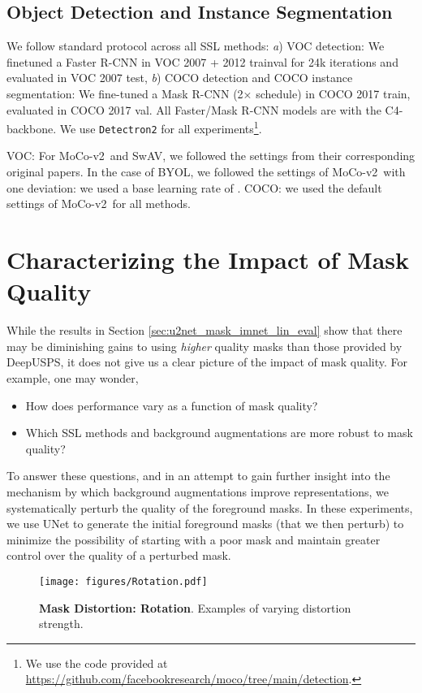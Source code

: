 \documentclass[twoside,11pt]{article}
\newcommand{\moco}{MoCo-v2}
\begin{document}
\subsection{Object Detection and Instance Segmentation}

We follow standard protocol across all SSL methods: \textit{a}) VOC detection: We finetuned a Faster R-CNN \citep{ren_faster_2015} in VOC 2007 + 2012 trainval for 24k iterations and evaluated in VOC 2007 test, \textit{b}) COCO detection and COCO instance segmentation: We fine-tuned a Mask R-CNN \citep{he_mask_2017} (2× schedule) in COCO 2017 train, evaluated in COCO 2017 val. All Faster/Mask R-CNN models are with the C4-backbone. We use \texttt{Detectron2} \citep{wu2019detectron2} for all experiments\footnote{We use the code provided at \url{https://github.com/facebookresearch/moco/tree/main/detection}.}.

VOC: For \moco~and SwAV, we followed the settings from their corresponding original papers. In the case of BYOL, we followed the settings of \moco~with one deviation: we used a base learning rate of . COCO: we used the default settings of \moco~for all methods.


\section{Characterizing the Impact of Mask Quality} 
\label{app:noisy_masks}
While the results in Section \ref{sec:u2net_mask_imnet_lin_eval} show that there may be diminishing gains to using \textit{higher} quality masks than those provided by DeepUSPS, it does not give us a clear picture of the impact of mask quality. For example, one may wonder,
\begin{itemize}
    \item How does performance vary as a function of mask quality?
    \item Which SSL methods and background augmentations are more robust to mask quality?
\end{itemize}

To answer these questions, and in an attempt to gain further insight into the mechanism by which background augmentations improve representations, we systematically perturb the quality of the foreground masks. In these experiments, we use UNet to generate the initial foreground masks (that we then perturb) to minimize the possibility of starting with a poor mask and maintain greater control over the quality of a perturbed mask. 

\begin{figure}
    \centering
    \texttt{[image: figures/Rotation.pdf]}
    \caption{{\bf Mask Distortion: Rotation}. Examples of varying distortion strength.}
    \label{fig: rotation}
\end{figure}
\end{document}
